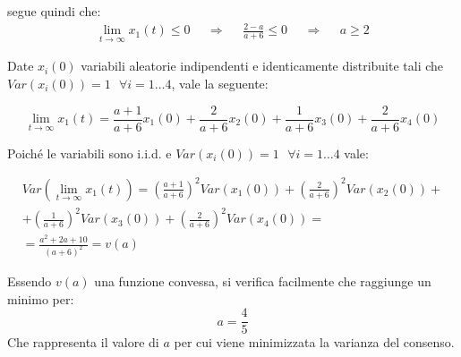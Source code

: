 \documentclass[11pt,largemargins]{homework}
\begin{document}
\begin{alphaparts}
    segue quindi che:
    \begin{align*}
      \lim\limits_{t \rightarrow \infty} x_1(t) \leq 0 &&\Rightarrow&& \frac{2-a}{a+6} \leq 0 && \Rightarrow && a \geq 2 
    \end{align*}


    \questionpart

    Date \(x_i(0)\) variabili aleatorie indipendenti e identicamente distribuite tali che \(Var(x_i(0))=1 \text{ }\forall i =1 \dots 4\), vale la seguente:

    \begin{equation*}
      \lim\limits_{t \rightarrow \infty} x_1(t) = \frac{a+1}{a+6}x_1(0)+\frac{2}{a+6}x_2(0)+ \frac{1}{a+6}x_3(0)+\frac{2}{a+6}x_4(0)
    \end{equation*}

    Poiché le variabili sono i.i.d. e \(Var(x_i(0))=1 \text{ }\forall i =1 \dots 4\) vale:

    \begin{gather*}
      Var\left(\lim\limits_{t \rightarrow \infty} x_1(t)\right) = \left(\frac{a+1}{a+6}\right)^2Var(x_1(0))+\left(\frac{2}{a+6}\right)^2Var(x_2(0))+\\+ \left(\frac{1}{a+6}\right)^2Var(x_3(0))+\left(\frac{2}{a+6}\right)^2Var(x_4(0)) = \\
      = \frac{a^2 + 2a + 10}{(a+6)^2}=v(a)
    \end{gather*}

    Essendo \(v(a)\) una funzione convessa, si verifica facilmente che raggiunge un minimo per:
    \begin{equation*}
      a= \frac{4}{5}
    \end{equation*}
    Che rappresenta il valore di \(a\) per cui viene minimizzata la varianza del consenso.

  \end{alphaparts}
  
\end{document}
